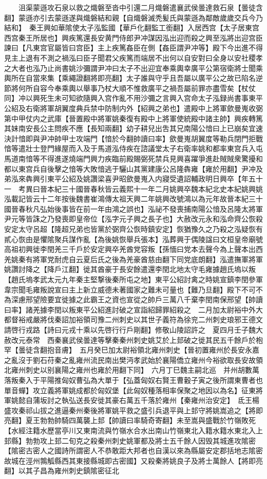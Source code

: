 　　沮渠蒙遜攻石泉以救之熾磐至沓中引還二月熾磐遣襄武侯曇達救石泉【曇徒含翻】蒙遜亦引去蒙遜遂與熾磐結和親【自熾磐滅秃髪氏與蒙遜為鄰敵歲歲交兵今乃結和】　秦王興如華隂使太子泓監國【華戶化翻監工銜翻】入居西宫【太子居東宫西宫秦王所居也】興疾篤還長安黄門侍郎尹冲謀因泓出迎而殺之興至泓將出迎宫臣諫曰【凡東宫官屬皆曰宫臣】主上疾篤姦臣在側【姦臣謂尹冲等】殿下今出進不得見主上退有不測之禍泓曰臣子聞君父疾篤而端居不出何以自安對曰全身以安社稷孝之大者也泓乃止尚書姚沙彌謂尹冲曰太子不出迎宜奉乘輿幸廣平公第宿衛將士聞乘輿所在自當來集【乘繩證翻將即亮翻】太子誰與守乎且吾屬以廣平公之故已陷名逆節將何所自容今奉乘輿以舉事乃杖大順不惟救廣平之禍吾屬前罪亦盡雪矣【杖仗同】冲以興死生未可知欲隨興入宫作亂不用沙彌之言興入宫命太子泓録尚書事東平公紹及右衛將軍胡翼度典兵禁中防制内外【紹興之弟也】遣殿中上將軍歛曼嵬收弼第中甲仗内之武庫【晉置殿中將軍姚秦復有殿中上將軍使統殿中諸主帥】興疾轉篤其妹南安長公主問疾不應【長知兩翻】幼子耕兒出吿其兄南陽公愔曰上已崩矣宜速決計愔即與尹冲帥甲士攻端門【愔於今翻帥讀曰率】歛曼嵬胡翼度等勒兵閉門拒戰愔等遣壯士登門緣屋而入及于馬道泓侍疾在諮議堂太子右衛率姚和都率東宫兵入屯馬道南愔等不得進遂燒端門興力疾臨前殿賜弼死禁兵見興喜躍爭進赴賊賊衆驚擾和都以東宫兵自後擊之愔等大敗愔逃于驪山其黨建康公呂隆犇雍【雍於用翻】尹冲及弟泓來犇興引東平公紹及姚讚梁喜尹昭歛曼嵬入内寢受遺詔輔政明日興卒【年五十一　考異曰晉本紀三十國晉春秋皆云義熙十一年二月姚興卒魏本紀北史本紀姚興姚泓載記皆云十二年按後魏書崔鴻傳太祖天興二年姚興改號鴻以為元年故晉本紀三十國晉春秋凡弘始後事皆在前一年由鴻之誤也】泓祕不發喪捕南陽公愔及呂隆太將軍尹元等皆誅之乃發喪即皇帝位【泓字元子興之長子也】大赦改元永和泓命齊公恢殺安定太守呂超【隆超兄弟也皆黨於弼齊公恢時鎮安定】恢猶豫久之乃殺之泓疑恢有貳心恢由是懼隂聚兵謀作亂【為後姚恢舉兵張本】泓葬興于偶陵諡曰文桓皇帝廟號高祖初興徙李閏羌三千戶於安定興卒羌酋党容叛【孫愐曰党本去聲今為上聲本出西羌姚秦有將軍党耐虎自云夏后氏之後為羌豪酋慈由翻下同党底朗翻】泓遣撫軍將軍姚讚討降之【降戶江翻】徙其酋豪于長安餘遣還李閏北地太守毛雍據趙氏塢以叛【趙氏塢孝武太元九年秦主堅撃後秦所屯之地】東平公紹討禽之時姚宣鎮李閏參軍韋宗聞毛雍叛說宣曰主上新立威德未著國家之難未可量也【難乃旦翻】殿下不可不為深慮邢望險要宜徙據之此霸王之資也宣從之帥戶三萬八千棄李閏南保邢望【帥讀曰率】諸羌據李閏以叛東平公紹進討破之宣詣紹歸罪紹殺之　二月加太尉裕中外大都督裕戒嚴將伐秦詔加裕領司豫二州刺史以其世子義符為徐兖二州刺史琅邪王德文請啓行戎路【詩曰元戎十乘以先啓行行戶剛翻】修敬山陵詔許之　夏四月壬子魏大赦改元泰常　西秦襄武侯曇達等擊秦秦州刺史姚艾於上邽破之徙其民五千餘戶於枹罕【曇徒含翻抱音膚】　五月癸巳加太尉裕領北雍州刺史【晉初置雍州於長安永嘉之亂沒于劉石苻秦之亂雍州流民南出樊沔孝武始於襄陽僑立雍州今裕欲取長安故領北雍州刺史以别襄陽之雍州也雍於用翻下同】　六月丁巳魏主嗣北巡　并州胡數萬落叛秦入于平陽推匈奴曹弘為大單于【弘蓋匈奴右賢王曹轂子寅之後所謂東曹者也單音蟬】攻立義將軍姚成都於匈奴堡【此匈奴種落相率保聚之地因以為名】征東將軍姚懿自蒲坂討之執弘送長安徙其豪右萬五千落於雍州【秦雍州治安定】　氐王楊盛攻秦祁山拔之進逼秦州秦後將軍姚平救之盛引兵退平與上邽守將姚嵩追之【將即亮翻】夏王勃勃帥騎四萬襲上邽【帥讀曰率騎奇寄翻】未至嵩與盛戰於竹嶺敗死【水經注籍水歷當亭川又東南流與竹嶺水合水出南山竹嶺東北入籍水籍水東北入上邽縣】勃勃攻上邽二旬克之殺秦州刺史姚軍都及將士五千餘人因毁其城進攻隂密【隂密古密人之國詩所謂密人不恭敢距大邦者也自漢以來為縣屬安定郡括地志隂密故城在涇州鶉觚縣西其東接縣城即古密國】又殺秦將姚良子及將士萬餘人【將即亮翻】以其子昌為雍州刺史鎮隂密征北